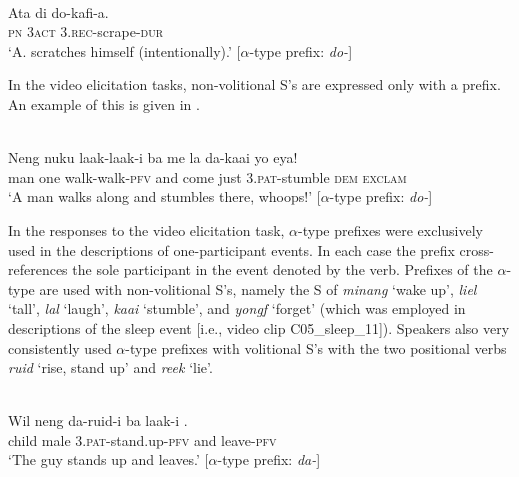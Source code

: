 \ea%
\label{bkm:Ref283207000}
 \\ 
\gll    Ata  di  do-kafi-a.\\  
      \textsc{pn} 3\textsc{act}  3.\textsc{rec}{}-scrape-\textsc{dur}\\
\glt  `A. scratches himself (intentionally).' [$\alpha $-type prefix: \textit{do-}]
\z







In the video elicitation tasks, non-volitional S's are expressed only with a prefix. An example of this is given in .


\ea%
\label{bkm:Ref383854029}
 \\ 
\gll    Neng  nuku  laak-laak-i  ba  me  la  da-kaai  yo  eya!\\  
    man  one  walk-walk-\textsc{pfv} and  come  just  3.\textsc{pat}{}-stumble  \textsc{dem} \textsc{exclam}\\
\glt  `A man walks along and stumbles there, whoops!' [$\alpha $-type prefix: \textit{do-}]
\z



 



In the responses to the video elicitation task, $\alpha $-type prefixes were exclusively used in the descriptions of one-participant events. In each case the prefix cross-references the sole participant in the event denoted by the verb. Prefixes of the $\alpha $-type are used with non-volitional  S's, namely the S of \textit{minang} `wake up', \textit{liel} `tall', \textit{lal} `laugh', \textit{kaai} `stumble', and \textit{yongf} `forget' (which was employed in descriptions of the sleep event [i.e., video clip C05\_sleep\_11]). Speakers also very consistently used $\alpha $-type prefixes with volitional S's with the two positional verbs \textit{ruid} `rise, stand up' and \textit{reek} `lie'.


\ea 
{} \\ 
 \gll    Wil  neng  da-ruid-i  ba  laak-i  .\\
    child  male  3.\textsc{pat}{}-stand.up-\textsc{pfv} and  leave-\textsc{pfv} \\
 \glt `The guy stands up and leaves.' [$\alpha $-type prefix: \textit{da-}]
\z





